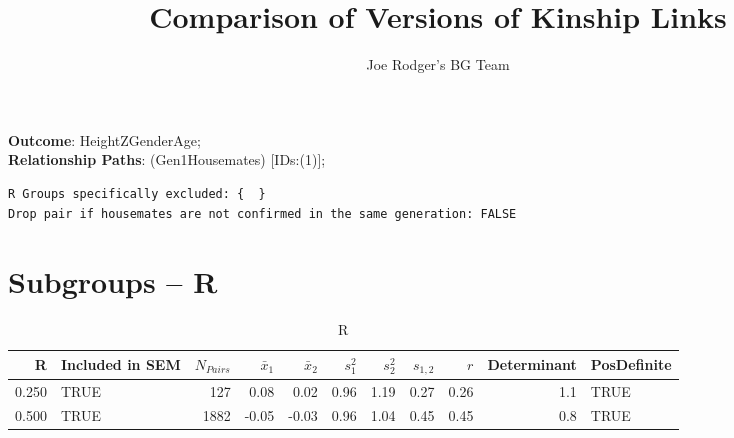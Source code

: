 \documentclass{article}\usepackage[]{graphicx}\usepackage[]{color}
\title{Comparison of Versions of Kinship Links}
\author{Joe Rodger's BG Team}
\makeatletter
\newenvironment{kframe}{%
 \def\at@end@of@kframe{}%
 \ifinner\ifhmode%
  \def\at@end@of@kframe{\end{minipage}}%
  \begin{minipage}{\columnwidth}%
 \fi\fi%
 \def\FrameCommand##1{\hskip\@totalleftmargin \hskip-\fboxsep
 \colorbox{shadecolor}{##1}\hskip-\fboxsep
     \hskip-\linewidth \hskip-\@totalleftmargin \hskip\columnwidth}%
 \MakeFramed {\advance\hsize-\width
   \@totalleftmargin\z@ \linewidth\hsize
   \@setminipage}}%
 {\par\unskip\endMakeFramed%
 \at@end@of@kframe}
\newenvironment{knitrout}{}{} %
\makeatother
\begin{document}
\maketitle
\setcounter{totalnumber}{8} %

\setlength{\parindent}{0pt}%














\textbf{Outcome}: HeightZGenderAge;\\
\textbf{Relationship Paths}: (Gen1Housemates) [IDs:(1)];\\

\begin{knitrout}
\color{fgcolor}\begin{kframe}
\begin{verbatim}
R Groups specifically excluded: {  }
Drop pair if housemates are not confirmed in the same generation: FALSE
\end{verbatim}
\end{kframe}
\end{knitrout}

\section{Subgroups --  R }%
\begin{table}[ht]
\centering
\begin{tabular}{rlrrrrrrrrl}
  \hline
R & Included in SEM & $N_{Pairs}$ & $\bar{x}_1$ & $\bar{x}_2$ & $s_1^2$ & $s_2^2$ & $s_{1,2}$ & $r$ & Determinant & PosDefinite \\ 
  \hline
0.250 & TRUE & 127 & 0.08 & 0.02 & 0.96 & 1.19 & 0.27 & 0.26 & 1.1 & TRUE \\ 
  0.500 & TRUE & 1882 & -0.05 & -0.03 & 0.96 & 1.04 & 0.45 & 0.45 & 0.8 & TRUE \\ 
   \hline
\end{tabular}
\caption{R} 
\end{table}
\end{document}
